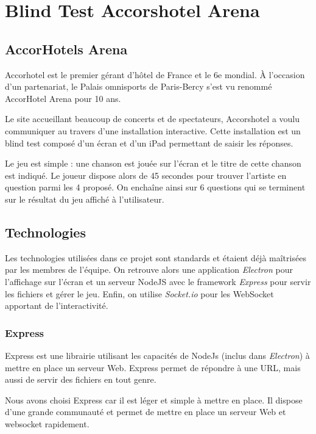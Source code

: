 \section{Blind Test Accorshotel Arena}

\subsection{AccorHotels Arena}

Accorhotel est le premier gérant d'hôtel de France et le 6e mondial.
À l'occasion d'un partenariat, le Palais omnisports de Paris-Bercy s'est vu renommé AccorHotel Arena pour 10 ans.

Le site accueillant beaucoup de concerts et de spectateurs, Accorshotel a voulu communiquer au travers d'une installation interactive.
Cette installation est un blind test composé d'un écran et d'un iPad permettant de saisir les réponses.

Le jeu est simple : une chanson est jouée sur l'écran et le titre de cette chanson est indiqué.
Le joueur dispose alors de 45 secondes pour trouver l'artiste en question parmi les 4 proposé.
On enchaîne ainsi sur 6 questions qui se terminent sur le résultat du jeu affiché à l'utilisateur.

\subsection{Technologies}

Les technologies utilisées dans ce projet sont standards et étaient déjà maîtrisées par les membres de l'équipe.
On retrouve alors une application \emph{Electron} pour l'affichage sur l'écran et un serveur NodeJS avec le framework \emph{Express} pour servir les fichiers et gérer le jeu.
Enfin, on utilise \emph{Socket.io} pour les WebSocket apportant de l'interactivité.

\subsubsection{Express}

Express est une librairie utilisant les capacités de NodeJs (inclus dans \emph{Electron}) à mettre en place un serveur Web.
Express permet de répondre à une URL, mais aussi de servir des fichiers en tout genre.

Nous avons choisi Express car il est léger et simple à mettre en place.
Il dispose d'une grande communauté et permet de mettre en place un serveur Web et websocket rapidement.

